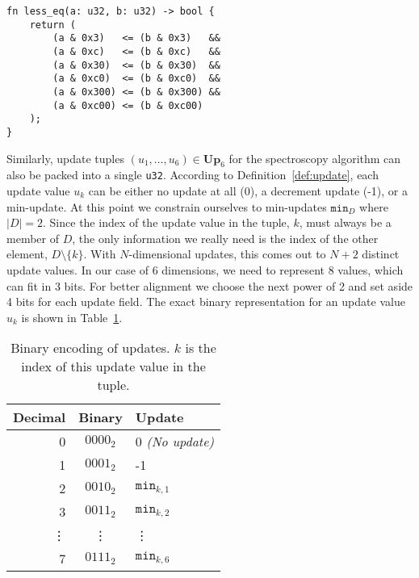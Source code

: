 \begin{lstlisting}[language=WGSL,float,
    caption={WGSL Shader Code handling bit-packed energies
        to calculate if $a \leq b$.
        This is only for the case of 6 elements with a maximum value of 3,
        other configurations will produce different shader code.
        The bitwise AND operation \texttt{a\;\&\;0x3} sets all but the 2
        least significant bits to 0,
        thus comparing just the first field.
        This is repeated with all six fields,
        where each bit mask is written in hexadecimal format.
        For example, hexadecimal C0$_{16}$ is $\ldots0\,1100\,0000_2$ in
        binary, selecting the fourth 2-bit field.
    },
    label=lst:less_eq]
fn less_eq(a: u32, b: u32) -> bool {
    return (
        (a & 0x3)   <= (b & 0x3)   &&
        (a & 0xc)   <= (b & 0xc)   &&
        (a & 0x30)  <= (b & 0x30)  &&
        (a & 0xc0)  <= (b & 0xc0)  &&
        (a & 0x300) <= (b & 0x300) &&
        (a & 0xc00) <= (b & 0xc00)
    );
}
\end{lstlisting}

Similarly, update tuples $(u_1, \ldots, u_6) \in \mathbf{Up}_6$
for the spectroscopy algorithm can also be packed into a single \texttt{u32}.
According to Definition~\ref{def:update}, each update value $u_k$ can be either
no update at all (0),
a decrement update (-1),
or a min-update.
At this point we constrain ourselves to min-updates $\mathtt{min}_D$  %
where $|D| = 2$.
Since the index of the update value in the tuple, $k$, must always be a member of $D$,
the only information we really need is the index of the other element, $D \setminus \{k\}$.
With $N$-dimensional updates, this comes out to $N + 2$ distinct update values.
In our case of 6 dimensions, we need to represent 8 values,
which can fit in 3 bits.
For better alignment we choose the next power
of 2 and set aside 4 bits for each update field.
The exact binary representation for an update value $u_k$ is shown in
Table~\ref{tab:update_encoding}.

\begin{table}[ht]
\centering
\caption{Binary encoding of updates. $k$ is the index of this update value in
the tuple.}\label{tab:update_encoding}
\begin{tabular}{ r c l }
    \toprule
    Decimal & Binary & Update \\
    \midrule
    0 & $0000_2$ & 0 \emph{(No update)} \\
    1 & $0001_2$ & -1 \\
    2 & $0010_2$ & $\mathtt{min}_{k, 1}$ \\ %
    3 & $0011_2$ & $\mathtt{min}_{k, 2}$ \\ %
    \vdots & \vdots & \vdots \\
    7 & $0111_2$ & $\mathtt{min}_{k, 6}$ \\ %
    \bottomrule
\end{tabular}
\end{table}

